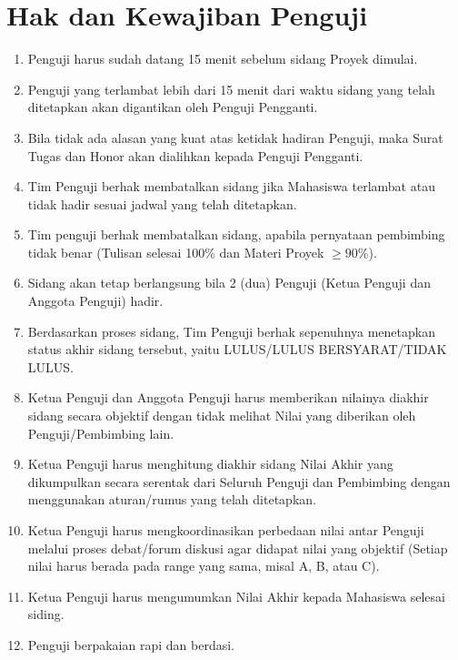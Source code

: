 \section{Hak	dan	Kewajiban	Penguji}
\begin{enumerate}
\item Penguji	harus	sudah	datang	15	menit	sebelum	sidang	Proyek	dimulai.
\item Penguji	yang	terlambat	lebih	dari	15	menit	dari	waktu	sidang	yang	telah	ditetapkan	akan	
digantikan	oleh	Penguji	Pengganti.
\item Bila	tidak	ada	alasan	yang	kuat	atas	ketidak	hadiran	Penguji,	maka	Surat	Tugas	dan	Honor	
akan	dialihkan	kepada	Penguji	Pengganti.
\item Tim	Penguji	berhak	membatalkan	sidang	jika	Mahasiswa	terlambat	atau	tidak	hadir	sesuai	
jadwal	yang	telah	ditetapkan.
\item Tim	 penguji	 berhak	 membatalkan	 sidang,	 apabila	 pernyataan	 pembimbing	 tidak	 benar	(Tulisan	selesai	100\%	dan	Materi	Proyek	$\geq90\%$).
\item Sidang	akan	tetap	berlangsung	bila	2	(dua)	Penguji	(Ketua	Penguji	dan	Anggota	Penguji)	
hadir.
\item Berdasarkan	 proses	 sidang,	 Tim	 Penguji	 berhak	 sepenuhnya	 menetapkan	 status	 akhir	
sidang	tersebut,	yaitu	LULUS/LULUS	BERSYARAT/TIDAK	LULUS.
\item Ketua	 Penguji	 	 dan	 Anggota	 Penguji	 harus	 memberikan	 nilainya	 diakhir	 sidang	 secara	
objektif	dengan	tidak	melihat	Nilai	yang	diberikan	oleh	Penguji/Pembimbing	lain.
\item Ketua	 Penguji	 harus	 menghitung	 diakhir	 sidang	 Nilai	 Akhir	 yang	 dikumpulkan	 secara	
serentak	dari	Seluruh	Penguji	dan	Pembimbing	dengan	menggunakan	aturan/rumus	yang	
telah	ditetapkan.
\item Ketua	 Penguji	 harus	 mengkoordinasikan	 perbedaan	 nilai	 antar	 Penguji	 melalui	 proses	
debat/forum	diskusi	agar	didapat	nilai	yang	objektif	(Setiap	nilai	harus	berada	pada	range	
yang	sama,	misal	A,	B,	atau	C).
\item Ketua	Penguji	harus	mengumumkan	Nilai	Akhir	kepada	Mahasiswa	selesai	siding.
\item Penguji	berpakaian	rapi	dan	berdasi.
\end{enumerate}


